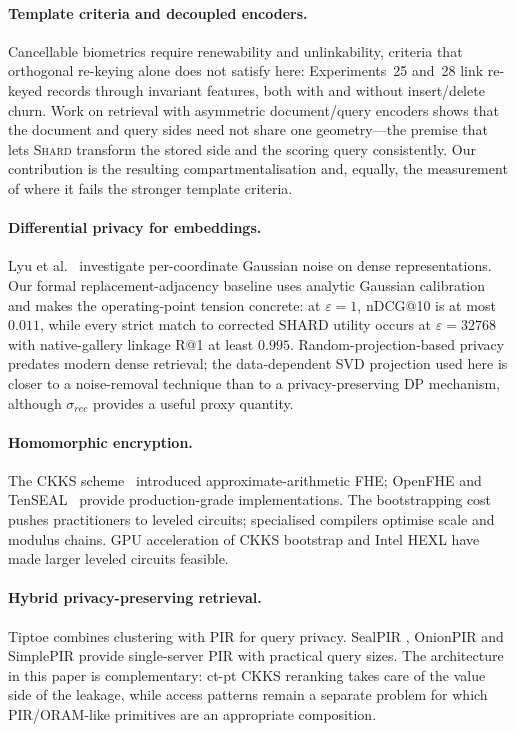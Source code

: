 \documentclass[11pt,a4paper]{article}
\begin{document}
\paragraph{Template criteria and decoupled encoders.}
Cancellable biometrics \cite{ref_cancellable} require renewability and
unlinkability, criteria that orthogonal re-keying alone does not satisfy here:
Experiments~25 and~28 link re-keyed records through invariant features, both
with and without insert/delete churn. Work on
retrieval with asymmetric
document/query encoders \cite{ref_dpr,ref_colbert} shows that the
document and query sides need not share one geometry---the premise that lets
\textsc{Shard} transform the stored side and the scoring query consistently.
Our contribution is the resulting compartmentalisation and, equally, the
measurement of where it fails the stronger template criteria.

\paragraph{Differential privacy for embeddings.} Lyu et al.~\cite{ref_lyu}
investigate per-coordinate Gaussian noise on dense representations. Our
formal replacement-adjacency baseline uses analytic Gaussian calibration and
makes the operating-point tension concrete: at $\varepsilon=1$, nDCG@10 is at
most $0.011$, while every strict match to corrected SHARD utility occurs at
$\varepsilon=32768$ with native-gallery linkage R@1 at least $0.995$.
Random-projection-based privacy
\cite{ref_jl,ref_liu,ref_kenthapadi} predates modern dense retrieval; the
data-dependent SVD projection used here is closer to a noise-removal
technique than to a privacy-preserving DP mechanism, although
$\sigma_{rec}$ provides a useful proxy quantity.

\paragraph{Homomorphic encryption.} The CKKS scheme~\cite{ref_ckks}
introduced approximate-arithmetic FHE; OpenFHE \cite{ref_openfhe} and
TenSEAL~\cite{ref_tenseal} provide production-grade implementations.
The bootstrapping cost \cite{ref_ckks_bootstrap} pushes practitioners
to leveled circuits; specialised compilers \cite{ref_eva,ref_chet}
optimise scale and modulus chains.
GPU acceleration of CKKS bootstrap \cite{ref_jung_gpu} and Intel HEXL
\cite{ref_hexl} have made larger leveled circuits feasible.

\paragraph{Hybrid privacy-preserving retrieval.} Tiptoe \cite{ref_tiptoe}
combines clustering with PIR for query privacy. SealPIR
\cite{ref_sealpir}, OnionPIR \cite{ref_onionpir} and SimplePIR
\cite{ref_simplepir} provide single-server PIR with practical query sizes.
The architecture in this paper is complementary: ct-pt CKKS reranking
takes care of the value side of the leakage, while access patterns
remain a separate problem for which PIR/ORAM-like primitives are an
appropriate composition.
\end{document}
